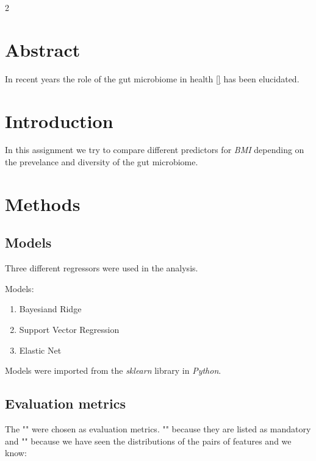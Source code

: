 \documentclass[12pt, a4paper]{article}
\begin{document}
\begin{multicols}{2}
    \section{Abstract} \label{sec:abs}

    In recent years the role of the gut microbiome in health \ref{} has been elucidated.
    \newline

    \section{Introduction} \label{sec:intro}

    In this assignment we try to compare different predictors for \textit{BMI} depending on the prevelance and diversity of the gut microbiome.
    \newline

    \section{Methods} \label{sec:methods}

    \subsection{Models} \label{subsec:models}

    Three different regressors were used in the analysis.
    \newline

    Models:
    \newline

    \begin{enumerate} \label{enm:models}
        \item Bayesiand Ridge
        \item Support Vector Regression
        \item Elastic Net
    \end{enumerate}

    Models were imported from the \textit{sklearn} library in \textit{Python}.
    \newline

    \subsection{Evaluation metrics} \label{subsec:metrics}

    The "" were chosen as evaluation metrics. "" because they are listed as mandatory and "" because we have seen the distributions of the pairs of features and we know:
    \newline


\end{multicols}
\end{document}
